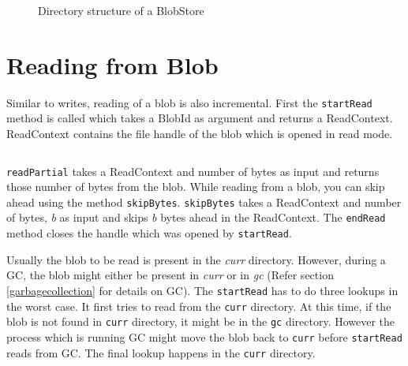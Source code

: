 \begin{figure}[hbt]
  \caption{Directory structure of a BlobStore}
  \label{fig:blobstore-dirstructure}
\end{figure}

\section{Reading from Blob} \label{readblob}
Similar to writes, reading of a blob is also incremental. First the \texttt{startRead} method is called which takes a BlobId as argument and returns a ReadContext. ReadContext contains the file handle of the blob which is opened in read mode.

\begin{program}
  \caption{Definition of ReadContext}
  \label{fig:defreadcontext}
  \inputminted{haskell}{hs/readcontext.hs}
\end{program}

\texttt{readPartial} takes a ReadContext and number of bytes as input and returns those number of bytes from the blob.
While reading from a blob, you can skip ahead using the method \texttt{skipBytes}. \texttt{skipBytes} takes a ReadContext and number of bytes, \textit{b} as input and skips \textit{b} bytes ahead in the ReadContext.
The \texttt{endRead} method closes the handle which was opened by \texttt{startRead}.

Usually the blob to be read is present in the \textit{curr} directory. However, during a GC, the blob might either be present in \textit{curr} or in \textit{gc} (Refer section \ref{garbagecollection} for details on GC). The \texttt{startRead} has to do three lookups in the worst case. It first tries to read from the \texttt{curr} directory.
At this time, if the blob is not found in \texttt{curr} directory, it might be in the \texttt{gc} directory. However the process which is running GC might move the blob back to \texttt{curr} before \texttt{startRead} reads from GC. The final lookup happens in the \texttt{curr} directory.

